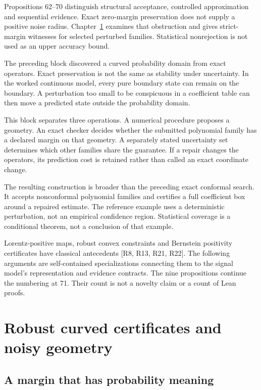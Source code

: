 Propositions 62--70 distinguish structural acceptance, controlled
approximation and sequential evidence. Exact zero-margin preservation
does not supply a positive noise radius. Chapter~\ref{LSM:book:chapter-37} examines that
obstruction and gives strict-margin witnesses for selected perturbed
families. Statistical nonrejection is not used as an upper accuracy
bound.


\label{LSM:part-vii.-robust-curved-certificates-and-noisy-geometry}

The preceding block discovered a curved probability domain from exact
operators. Exact preservation is not the same as stability under
uncertainty. In the worked continuous model, every pure boundary state
can remain on the boundary. A perturbation too small to be conspicuous
in a coefficient table can then move a predicted state outside the
probability domain.

This block separates three operations. A numerical procedure proposes a
geometry. An exact checker decides whether the submitted polynomial
family has a declared margin on that geometry. A separately stated
uncertainty set determines which other families share the guarantee. If
a repair changes the operators, its prediction cost is retained rather
than called an exact coordinate change.

The resulting construction is broader than the preceding exact conformal
search. It accepts nonconformal polynomial families and certifies a full
coefficient box around a repaired estimate. The reference example uses a
deterministic perturbation, not an empirical confidence region.
Statistical coverage is a conditional theorem, not a conclusion of that
example.

Lorentz-positive maps, robust convex constraints and Bernstein
positivity certificates have classical antecedents {[}R8, R13, R21,
R22{]}. The following arguments are self-contained specializations
connecting them to the signal model's representation and evidence
contracts. The nine propositions continue the numbering at 71. Their
count is not a novelty claim or a count of Lean proofs.


\chapter{Robust curved certificates and noisy geometry}\label{LSM:book:chapter-37}
\section{A margin that has probability meaning}\label{LSM:a-margin-that-has-probability-meaning}

